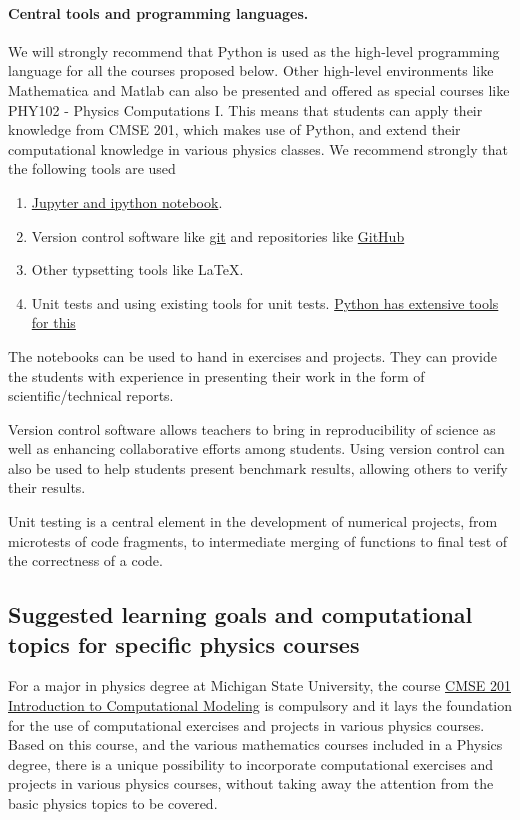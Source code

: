 \paragraph{Central tools and programming languages.}
We will strongly recommend that Python is used as the high-level programming language for all the courses proposed below. Other high-level environments like Mathematica and Matlab can also be presented and offered as special courses like PHY102 - Physics Computations I. This means that students can apply their knowledge from CMSE 201, which makes use of Python, and extend their computational knowledge in various physics classes. We recommend strongly that the following tools are used
\begin{enumerate}
\item \href{{http://jupyter.org/}}{Jupyter and ipython notebook}.

\item Version control software like \href{{https://git-scm.com/}}{git} and repositories like \href{{https://github.com/}}{GitHub}

\item Other typsetting tools like {\LaTeX}.

\item Unit tests and using existing tools for unit tests. \href{{https://docs.python.org/2/library/unittest.html}}{Python has extensive tools for this}
\end{enumerate}

\noindent
The notebooks can be used to hand in exercises and projects. They can provide the students with experience in presenting their work in the form of scientific/technical reports.

Version control software allows teachers to bring in reproducibility of science as well as enhancing
collaborative efforts among students. Using version control can also be used to help students present benchmark results, allowing others to verify their results.

Unit testing is a central element in the development of numerical projects, from microtests of code fragments, to intermediate merging of functions to final test of the correctness of a code.

\subsection{Suggested learning goals and computational topics for specific physics courses}

For a major in physics degree at Michigan State University, the course \href{{https://cmse.msu.edu/academics/undergraduate-program/undergraduate-courses/cmse-201-introduction-to-computational-modeling/}}{CMSE 201 Introduction to Computational Modeling} is compulsory and it lays the foundation for the use of computational exercises and projects in various physics courses. Based on this course, and the various mathematics courses included in a Physics degree, there is a unique possibility to incorporate computational exercises and projects in various physics courses, without taking away the attention from the basic physics topics to be covered.

